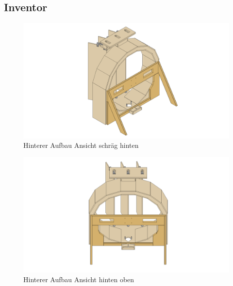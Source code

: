\subsection{Inventor}
\begin{figure}[H]
    \centering
    \includegraphics[width=.92\textwidth]{../Inventor/hintererAufbau/png/hintererAufbau_hinten.png}
    \caption{Hinterer Aufbau Ansicht schräg hinten}
\end{figure}
\begin{figure}[H]
    \centering
    \includegraphics[width=.92\textwidth]{../Inventor/hintererAufbau/png/hintererAufbau_hintenOben.png}
    \caption{Hinterer Aufbau Ansicht hinten oben}
\end{figure}

